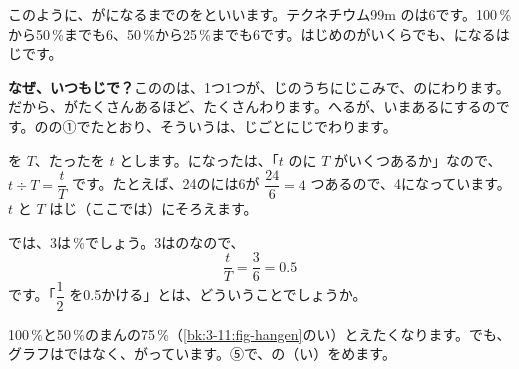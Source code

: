 このように、がになるまでのを\textbf{}といいます。テクネチウム99m のは6です。100\,\%から50\,\%までも6、50\,\%から25\,\%までも6です。はじめのがいくらでも、になるはじです。

\textbf{なぜ、いつもじで？}\quad こののは、1つ1つが、じのうちにじこみで、のにわります。だから、がたくさんあるほど、たくさんわります。へるが、いまあるにするのです。のの①でたとおり、そういうは、じごとにじでわります。

を $T$、たったを $t$ とします。になったは、「$t$ のに $T$ がいくつあるか」なので、$t\div T=\dfrac{t}{T}$ です。たとえば、24のには6が $\dfrac{24}{6}=4$ つあるので、4になっています。
$t$ と $T$ はじ（ここでは）にそろえます。

では、3は\,\%でしょう。3はのなので、
\[ \frac{t}{T}=\frac{3}{6}=0.5 \]
です。「$\dfrac{1}{2}$ を0.5かける」とは、どういうことでしょうか。

100\,\%と50\,\%のまんの75\,\%（\ref{bk:3-11:fig-hangen}のい）とえたくなります。でも、グラフはではなく、がっています。⑤で、の（い）をめます。

